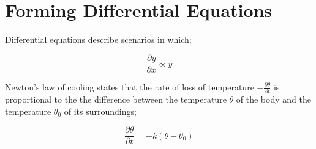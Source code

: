 \documentclass{article}
\begin{document}
\section{Forming Differential Equations}

Differential equations describe scenarios in which;

\[\frac{\partial y}{\partial x}\propto y\]

\noindent Newton's law of cooling states that the rate of loss of temperature $-\frac{\partial\theta}{\partial t}$ is proportional to the the difference between the temperature $\theta$ of the body and the temperature $\theta_0$ of its surroundings;

\[\frac{\partial\theta}{\partial t}=-k(\theta-\theta_0)\]
\end{document}
